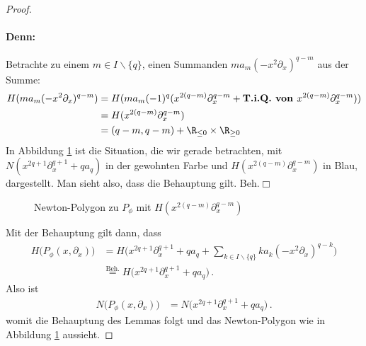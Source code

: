 \begin{proof}
\paragraph{Denn:}
Betrachte zu einem $m\in I\backslash \{q\}$, einen Summanden
$ma_m(-x^2\partial_x)^{q-m}$ aus der Summe:
\begin{align*}
H(ma_m(-x^2\partial_x)^{q-m}) &= H(ma_m(-1)^q(x^{2(q-m)}\partial_x^{q-m}
  +\textbf{T.i.Q. von }x^{2(q-m)}\partial_x^{q-m}))
\\&=H(x^{2(q-m)}\partial_x^{q-m})
\\&=(q-m,q-m) + \R_{\leq 0}\times \R_{\geq 0}
\end{align*}
In Abbildung \ref{fig:Newton-PolygonP_phi} ist die Situation, die wir gerade
betrachten, mit $N(x^{2q + 1}\partial_x^{q + 1} + qa_q)$ in der gewohnten Farbe
und $H(x^{2(q-m)}\partial_x^{q-m})$ in Blau, dargestellt.  Man sieht also, dass
die Behauptung gilt.
\hfill Beh.\ensuremath{\Box}

\begin{figure}[htbp] %
\begin{center}
\end{center}
\caption{Newton-Polygon zu $P_{\phi}$ mit $H(x^{2(q-m)}\partial_x^{q-m})$}
\label{fig:Newton-PolygonP_phi}
\end{figure}
Mit der Behauptung gilt dann, dass
\begin{align*}
H\Big(P_{\phi}(x,\partial_x)\Big)
  &= H\Big(x^{2q + 1}\partial_x^{q + 1} + qa_q
  + \sum_{k\in I\backslash\{q\}}k a_k(-x^2\partial_x)^{q-k} \Big)
\\&\overset{\text{Beh.}}{=} H\Big(x^{2q + 1}\partial_x^{q + 1} + qa_q \Big) \,.
\end{align*}
Also ist
\begin{align*}
N\Big(P_{\phi}(x,\partial_x)\Big)
  &= N\Big(x^{2q + 1}\partial_x^{q + 1} + qa_q \Big) \,.
\end{align*}
womit die Behauptung des Lemmas folgt und das Newton-Polygon wie in Abbildung
\ref{fig:Newton-PolygonP_phi} aussieht.
\end{proof}
